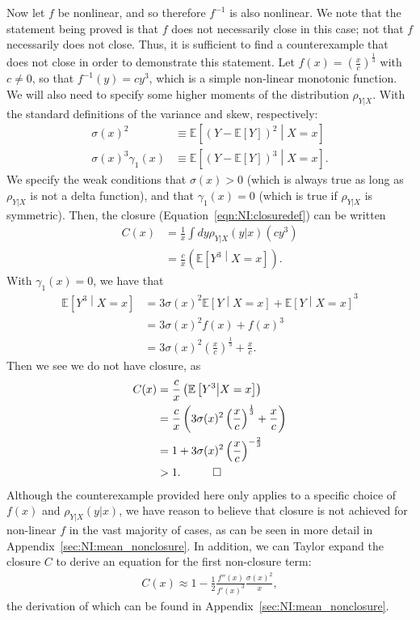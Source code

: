 Now let $f$ be nonlinear, and so therefore $f^{-1}$ is also nonlinear. We note that the statement being proved is that $f$ does not necessarily close in this case; not that $f$ necessarily does not close. Thus, it is sufficient to find a counterexample that does not close in order to demonstrate this statement. Let $f(x) = \left(\frac{x}{c}\right)^{\frac{1}{3}}$ with $c\ne 0$, so that $f^{-1}(y) = cy^3$, which is a simple non-linear monotonic function. We will also need to specify some higher moments of the distribution $\rho_{Y|X}$. With the standard definitions of the variance and skew, respectively:
\begin{align}
\sigma(x)^2&\equiv
\mathbb{E}\left[\left(Y-\mathbb{E}\left[Y\right]\right)^2\middle| X=x\right]\\
\sigma(x)^3\gamma_1(x) &\equiv \mathbb{E}\left[\left(Y-\mathbb{E}\left[Y\right]\right)^3\middle| X=x\right].
\end{align}
We specify the weak conditions that $\sigma(x) >0$ (which is always true as long as $\rho_{Y|X}$ is not a delta function), and that $\gamma_1(x)=0$ (which is true if $\rho_{Y|X}$ is symmetric).  Then, the closure (Equation~\ref{eqn:NI:closuredef}) can be written
\begin{align}
  C(x) &=\frac{1}{x} \int dy \rho_{Y|X}(y|x) \left(cy^3\right)\nonumber\\
&=\frac{c}{x} \left(\mathbb{E}\left[Y^3\middle| X=x\right]\right).
\end{align}
With $\gamma_1(x)=0$, we have that
\begin{align}
\mathbb{E}\left[Y^3\middle| X=x\right] &= 3\sigma(x)^2\mathbb{E}\left[Y\middle| X=x\right] + \mathbb{E}\left[Y\middle| X=x\right]^3\nonumber\\
&=3\sigma(x)^2f(x)+f(x)^3\nonumber\\
&=3\sigma(x)^2\left(\frac{x}{c}\right)^{\frac{1}{3}}+\frac{x}{c}.
\end{align}
Then we see we do not have closure, as
\begin{align}
  C(x) &=\frac{c}{x} \left(\mathbb{E}\left[Y^3\middle| X=x\right]\right)\nonumber\\
&=\frac{c}{x} \left(3\sigma(x)^2\left(\frac{x}{c}\right)^{\frac{1}{3}}+\frac{x}{c}\right)\nonumber\\
&= 1 + 3\sigma(x)^2\left(\frac{x}{c}\right)^{-\frac{2}{3}}\nonumber\\
&>1. \hspace{1 cm}\Box
\end{align}
Although the counterexample provided here only applies to a specific choice of $f(x)$ and $\rho_{Y|X}(y|x)$, we have reason to believe that closure is not achieved for non-linear $f$ in the vast majority of cases, as can be seen in more detail in Appendix~\ref{sec:NI:mean_nonclosure}. In addition, we can Taylor expand the closure $C$ to derive an equation for the first non-closure term:
\begin{align}
  C(x) \approx 1-\frac{1}{2}\frac{f''(x)}{f'(x)^3}\frac{\sigma(x)^2}{x},
\label{eqn:NI:closureseries_text}
\end{align}
the derivation of which can be found in Appendix~\ref{sec:NI:mean_nonclosure}.

